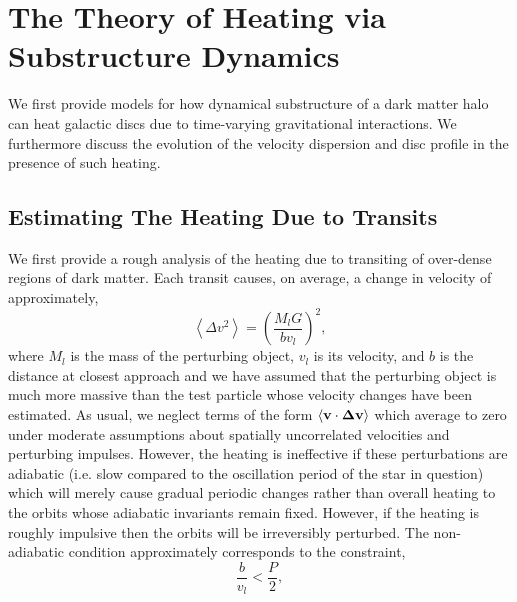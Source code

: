 \documentclass[usenatbib]{mnras}
\newcommand{\EV}[1]{\left< #1 \right>}
\begin{document}
\section{The Theory of Heating via Substructure Dynamics} \label{secton:heating}

We first provide models for how dynamical substructure of a dark matter halo can heat galactic discs due to time-varying gravitational interactions. We furthermore discuss the evolution of the velocity dispersion and disc profile in the presence of such heating. 

\subsection{Estimating The Heating Due to Transits}
We first provide a rough analysis of the heating due to transiting of over-dense regions of dark matter. Each transit causes, {\color{magenta} on average,} a change in velocity of approximately,
\begin{equation}
\EV{\Delta v^2} = \left( \frac{M_l G}{b v_l} \right)^2,
\end{equation}
where $M_l$ is the mass of the {\color{magenta} perturbing object}, $v_l$ is its velocity, and $b$ is the distance at closest approach {\color{magenta} and we have assumed that the perturbing object is much more massive than the test particle whose velocity changes have been estimated. As usual, we neglect terms of the form $\EV{\bf{v} \cdot \Delta \bf{v}}$ which average to zero under moderate assumptions about spatially uncorrelated velocities and perturbing impulses.} However, the heating is ineffective if these perturbations are adiabatic (i.e. slow compared to the oscillation period of the star in question) which will merely cause gradual periodic changes rather than overall heating to the orbits whose adiabatic invariants remain fixed. However, if the heating is roughly impulsive then the orbits will be irreversibly perturbed. The non-adiabatic condition approximately corresponds to the constraint,
\begin{equation} \label{adiabatic}
\frac{b}{v_l} < \frac{P}{2},
\end{equation}
\end{document}
